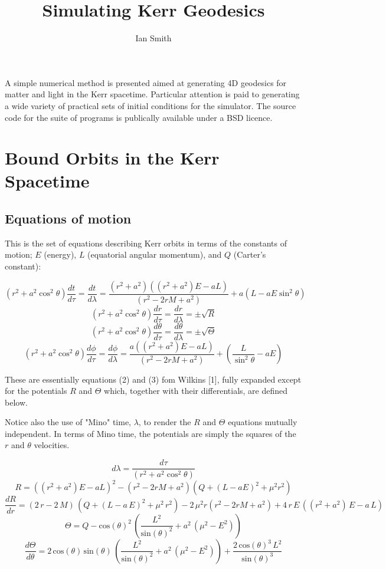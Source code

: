 \documentclass[11pt]{article}
\title{\textbf{Simulating Kerr Geodesics}}
\author{Ian Smith}
\date{}
\begin{document}
\maketitle

\abstract
A simple numerical method is presented aimed at generating 4D geodesics for matter and light in the Kerr spacetime.  Particular attention is paid to generating a wide variety of practical sets of initial conditions for the simulator.  The source code for the suite of programs is publically available under a BSD licence.

\section{Bound Orbits in the Kerr Spacetime}

\subsection {Equations of motion}

This is the set of equations describing Kerr orbits in terms of the constants of motion; $E$ (energy), $L$ (equatorial angular momentum), and $Q$ (Carter's constant):

$$
(r^2 + a^2 \cos^2\theta) \frac{d t}{d \tau} = \frac{d t}{d \lambda} = \frac{(r^2 + a^2) ((r^2 + a^2) E - aL)} {({r}^{2} - 2rM  + {a}^{2})} + a(L - aE \sin^2 \theta)
$$
$$
(r^2 + a^2 \cos^2\theta) \frac{d r}{d \tau} = \frac{d r}{d \lambda} = \pm \sqrt R
$$
$$
(r^2 + a^2 \cos^2\theta) \frac{d \theta}{d \tau} = \frac{d \theta}{d \lambda} = \pm \sqrt \Theta
$$
$$
(r^2 + a^2 \cos^2\theta) \frac{d \phi}{d \tau}= \frac{d \phi}{d \lambda} = \frac{a ((r^2 + a^2) E - aL)} {({r}^{2} - 2rM  + {a}^{2})} + (\frac {L} {\sin^2 \theta} -aE)
$$

These are essentially equations (2) and (3) fom Wilkins [1], fully expanded except for the potentials $R$ and $\Theta$ which, together with their differentials, are defined below.

Notice also the use of "Mino" time, $\lambda$, to render the $R$ and $\Theta$ equations mutually independent.  In terms of Mino time, the potentials are simply the squares of the $r$ and $\theta$ velocities.

$$
d \lambda = \frac {d \tau} {(r^2 + a^2 \cos^2\theta)}
$$
$$
R = ((r^2 + a^2) E - aL)^2 - (r^2 - 2rM  + a^{2}) ( Q+{\left( L - aE\right) }^{2}+{\mu}^{2}{r}^{2})
$$
$$
\frac{d R}{d r} = \left( 2\,r - 2\,M\right) \,\left( Q+{\left( L - a\,E\right) }^{2}+{\mu}^{2}\,{r}^{2}\right) - 2\,{\mu}^{2}r({r}^{2} - 2rM  + {a}^{2}) +4\,r\,E\,\left( \left( {r}^{2}+{a}^{2}\right) \,E - a\,L\right)
$$
$$
\Theta=Q - {\mathrm{cos}\left( \theta\right) }^{2}\,\left( \frac{{L}^{2}}{{\mathrm{sin}\left( \theta\right) }^{2}}+{a}^{2}\,\left( {\mu}^{2} - {E}^{2}\right) \right)
$$
$$
\frac{d \Theta}{d \theta} = 2\,\mathrm{cos}\left( \theta\right) \,\mathrm{sin}\left( \theta\right) \,\left( \frac{{L}^{2}}{{\mathrm{sin}\left( \theta\right) }^{2}}+{a}^{2}\,\left( {\mu}^{2} - {E}^{2}\right) \right) +\frac{2\,{\mathrm{cos}\left( \theta\right) }^{3}\,{L}^{2}}{{\mathrm{sin}\left( \theta\right) }^{3}}
$$
\end{document}
